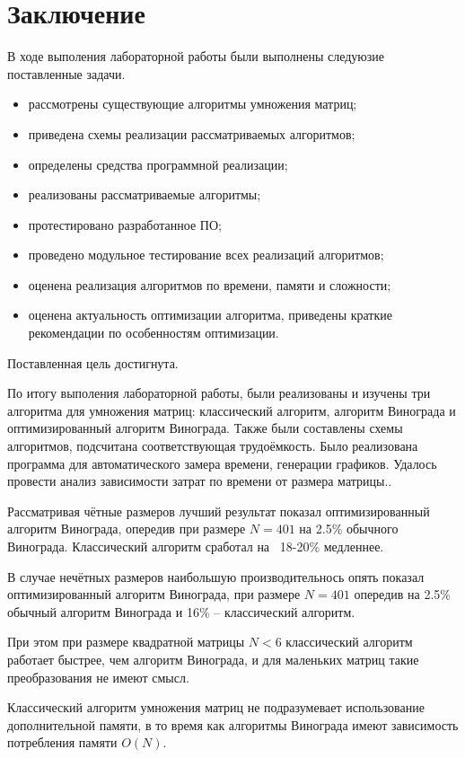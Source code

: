 \chapter{Заключение}

В ходе выполения лабораторной работы были выполнены следуюзие поставленные задачи.

\begin{itemize}
	\item рассмотрены существующие алгоритмы умножения матриц;
	\item приведена схемы реализации рассматриваемых алгоритмов;
	\item определены средства программной реализации;
	\item реализованы рассматриваемые алгоритмы;
	\item протестировано разработанное ПО;
	\item проведено модульное тестирование всех реализаций алгоритмов;
	\item оценена реализация алгоритмов по времени, памяти и сложности;
	\item оценена актуальность оптимизации алгоритма, приведены краткие рекомендации по особенностям оптимизации.
\end{itemize}

Поставленная цель достигнута.

По итогу выполения лабораторной работы, были реализованы и изучены три алгоритма для умножения матриц: классический алгоритм,
алгоритм Винограда и оптимизированный алгоритм Винограда.
Также были составлены схемы алгоритмов, подсчитана соответствующая трудоёмкость.
Было реализована программа для автоматического замера времени, генерации графиков.
Удалось провести анализ зависимости затрат по времени от размера матрицы..

Рассматривая чётные размеров лучший результат показал оптимизированный алгоритм Винограда, опередив при размере $N=401$
на 2.5\% обычного Винограда. Классический алгоритм сработал на ~18-20\% медленнее.

В случае нечётных размеров наибольшую производительнось опять показал оптимизированный алгоритм Винограда, при размере $N=401$
опередив на 2.5\% обычный алгоритм Винограда и 16\% -- классический алгоритм.

При этом при размере квадратной матрицы $N<6$ классический алгоритм работает быстрее, чем алгоритм Винограда,
и для маленьких матриц такие преобразования не имеют смысл.

Классический алгоритм умножения матриц не подразумевает использование дополнительной памяти, в то время как
алгоритмы Винограда имеют зависимость потребления памяти $O(N)$.
